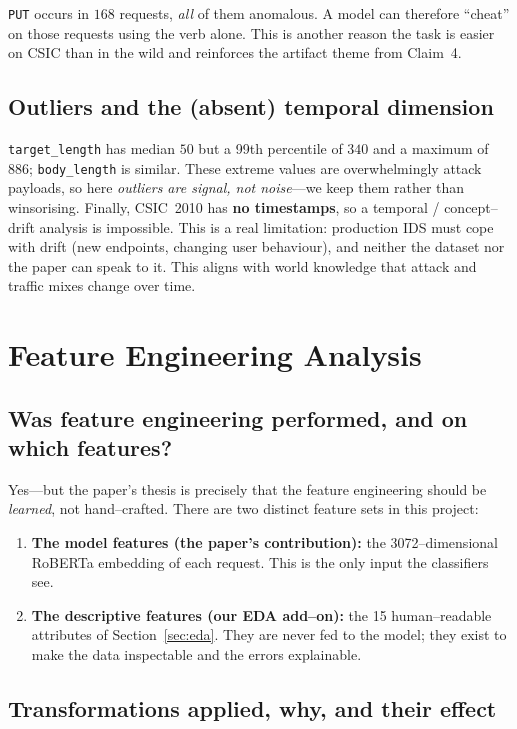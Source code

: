 \documentclass[11pt,a4paper]{article}
\begin{document}
\noindent \texttt{PUT} occurs in $168$ requests, \emph{all} of them anomalous. A model can
therefore ``cheat'' on those requests using the verb alone. This is another reason the
task is easier on CSIC than in the wild and reinforces the artifact theme from Claim~4.

\subsection{Outliers and the (absent) temporal dimension}
\texttt{target\_length} has median $50$ but a 99th percentile of $340$ and a maximum of
$886$; \texttt{body\_length} is similar. These extreme values are overwhelmingly attack
payloads, so here \emph{outliers are signal, not noise}---we keep them rather than
winsorising. Finally, CSIC~2010 has \textbf{no timestamps}, so a temporal / concept--drift
analysis is impossible. This is a real limitation: production IDS must cope with drift
(new endpoints, changing user behaviour), and neither the dataset nor the paper can speak
to it. This aligns with world knowledge that attack and traffic mixes change over time.

\section{Feature Engineering Analysis}
\label{sec:fe}

\subsection{Was feature engineering performed, and on which features?}
Yes---but the paper's thesis is precisely that the feature engineering should be
\emph{learned}, not hand--crafted. There are two distinct feature sets in this project:
\begin{enumerate}[nosep,leftmargin=1.4em]
  \item \textbf{The model features (the paper's contribution):} the 3072--dimensional
        RoBERTa embedding of each request. This is the only input the classifiers see.
  \item \textbf{The descriptive features (our EDA add--on):} the 15 human--readable
        attributes of Section~\ref{sec:eda}. They are never fed to the model; they exist
        to make the data inspectable and the errors explainable.
\end{enumerate}

\subsection{Transformations applied, why, and their effect}
\end{document}
